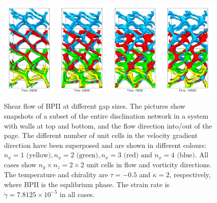 \documentclass[12pt,twoside]{iopart}
\newcommand{\ex}[1]{\times10^{#1}}
\begin{document}
\begin{figure}[t]
\includegraphics[width=0.24\textwidth]{bp2_t-0o5_k2_25k_y.png}
\includegraphics[width=0.24\textwidth]{bp2_t-0o5_k2_50k_y.png}
\includegraphics[width=0.24\textwidth]{bp2_t-0o5_k2_75k_y.png}
\includegraphics[width=0.24\textwidth]{bp2_t-0o5_k2_100k_y.png}
\caption{Shear flow of BPII at different gap sizes. The pictures show
snapshots of a subset of the entire disclination network in a system
with walls at top and bottom, and the flow direction into/out of the
page. The different number of unit cells in the velocity gradient
direction have been superposed and are shown in different colours:
$n_x=1 \mbox{ (yellow)}, n_x=2 \mbox{ (green)}, n_x=3 \mbox{ (red) and }
n_x=4 \mbox{ (blue)}$. All cases show $n_y \times n_z =2 \times 2$ unit
cells in flow and vorticity directions. The temperature and chirality are
$\tau=-0.5$ and $\kappa=2$, respectively, where BPII is the equlibrium phase.
The strain rate is $\dot{\gamma}=7.8125\ex{-5}$ in all cases.}
\label{fig1}
\end{figure}
\end{document}
